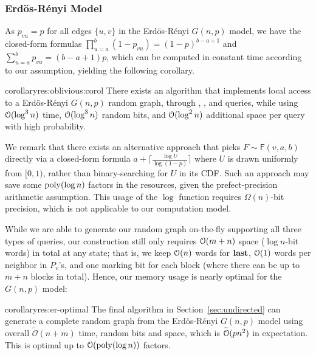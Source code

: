 \subsubsection{Erd\"{o}s-R\'{e}nyi Model}
\label{sec:app_er}
As $p_{vu} = p$ for all edges $\{u,v\}$ in the Erd\"{o}s-R\'{e}nyi $G(n,p)$ model, we have the closed-form formulas $\prod_{u=a}^b (1-p_{vu}) = (1-p)^{b-a+1}$ and $\sum_{u=a}^b p_{vu} = (b-a+1)p$, which can be computed in constant time according to our assumption, yielding the following corollary.
\begin{restatable}{corollary}{res:oblivious:corol}
There exists an algorithm that implements local access to a Erd\"{o}s-R\'{e}nyi $G(n,p)$ random graph,
through , , and  queries,
while using $\mathcal{O}(\log^3 n)$ time, $\mathcal{O}(\log^3 n)$ random bits, and $\mathcal{O}(\log^2 n)$ additional space per query with high probability.
\end{restatable}

We remark that there exists an alternative approach that picks $F\sim\mathsf{F}(v,a,b)$ directly via a closed-form formula $a+\lceil\frac{\log U}{\log (1-p)}\rceil$ where $U$ is drawn uniformly from $[0,1)$, rather than binary-searching for $U$ in its CDF. Such an approach may save some $\mathrm{poly}(\log n)$ factors in the resources, given the prefect-precision arithmetic assumption. This usage of the $\log$ function requires $\Omega(n)$-bit precision, which is not applicable to our computation model.

While we are able to generate our random graph on-the-fly supporting all three types of queries, our construction still only requires $\mathcal{O}(m+n)$ space ($\log n$-bit words) in total at any state; that is, we keep $\mathcal{O}(n)$ words for $\mathbf{last}$, $\mathcal{O}(1)$ words per neighbor in $P_v$'s, and one marking bit for each block (where there can be up to $m+n$ blocks in total). Hence, our memory usage is nearly optimal for the $G(n,p)$ model:

\begin{restatable}{corollary}{res:er-optimal}
\label{thm:er-optimal}
The final algorithm in Section~\ref{sec:undirected} can generate a complete random graph
from the Erd\"{o}s-R\'{e}nyi $G(n,p)$ model using overall
$\widetilde{\mathcal{O}}(n+m)$ time, random bits and space, which is $\widetilde{\mathcal{O}}(pn^2)$ in expectation.
This is optimal up to $ \mathcal{O}(\mathrm{poly}(\log n))$ factors.
\end{restatable}

\iffalse
The deterministic version (Section~\ref{sec:ER-det}) does not require the extra overhead resulting from failed iterations.
However, the two level data-structure introduces an extra $\Bo(\log n)$ factor, resulting in the same overall running time.
However, this only requires one $N$-bit random word.
\fi





